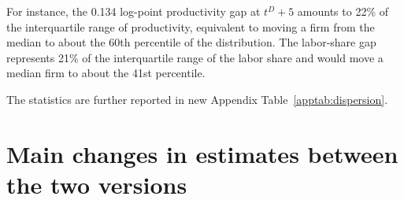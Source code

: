 \documentclass[11pt]{article}
\begin{document}
{\begin{enumerate}[leftmargin=*]
For instance, the 0.134 log-point productivity gap at $t^D+5$ amounts to 22\% of the interquartile range of productivity, equivalent to moving a firm from the median to about the 60th percentile of the distribution. The labor-share gap represents 21\% of the interquartile range of the labor share and would move a median firm to about the 41st percentile.

The statistics are further reported in new Appendix Table~\ref{apptab:dispersion}.

\end{enumerate}}\par


\section*{Main changes in estimates between the two versions}
\end{document}
